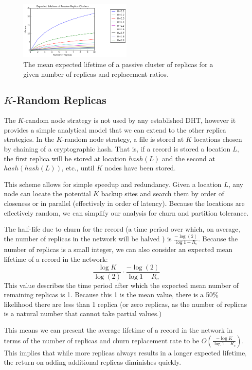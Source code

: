 \begin{figure}[h!]
	\includegraphics[width=0.5\textwidth]{figs/lifetime}
	\caption{The mean expected lifetime of a passive cluster of replicas for a given number of replicas and replacement ratios.}
\end{figure}

\subsection{$K$-Random Replicas}
The $K$-random node strategy is not used by any established DHT, however it provides a simple analytical model that we can extend to the other replica strategies.
In the $K$-random node strategy, a file is stored at $K$ locations chosen by chaining of a cryptographic hash.
That is, if a record is stored a location $L$, the first replica will be stored at location $hash(L)$ and the second at $hash(hash(L))$, etc., until $K$ nodes have been stored.

This scheme allows for simple speedup and redundancy.
Given a location $L$, any node can locate the potential $K$ backup sites and search them by order of closeness or in parallel (effectively in order of latency).
Because the locations are effectively random, we can simplify our analysis for churn and partition tolerance.

The half-life due to churn for the record (a time period over which, on average, the number of replicas in the network will be halved ) is $\frac{-\log(2)}{\log{1-R_{c}}}$.
Because the number of replicas is a small integer, we can also consider an expected mean lifetime of a record in the network: $$\frac{\log{K}}{\log(2)} \cdot \frac{-\log(2)}{\log{1-R_{c}}}$$ 
This value describes the time period after which the expected mean number of remaining replicas is 1. 
Because this 1 is the mean value, there is a 50\% likelihood there are less than 1 replica (or zero replicas, as the number of replicas is a natural number that cannot take partial values.)

This means we can present the average lifetime of a record in the network in terms of the number of replicas and churn replacement rate to be $O(\frac{-\log{K}}{\log{1-R_{c}}})$.
This implies that while more replicas always results in a longer expected lifetime, the return on adding additional replicas diminishes quickly.


